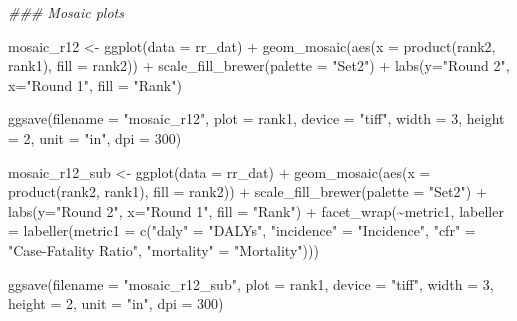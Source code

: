 \documentclass[
  letterpaper,
  DIV=11,
  numbers=noendperiod]{scrartcl}
\newenvironment{Shaded}{\begin{snugshade}}{\end{snugshade}}
\newcommand{\AttributeTok}[1]{\textcolor[rgb]{0.40,0.45,0.13}{#1}}
\newcommand{\DecValTok}[1]{\textcolor[rgb]{0.68,0.00,0.00}{#1}}
\newcommand{\DocumentationTok}[1]{\textcolor[rgb]{0.37,0.37,0.37}{\textit{#1}}}
\newcommand{\FunctionTok}[1]{\textcolor[rgb]{0.28,0.35,0.67}{#1}}
\newcommand{\NormalTok}[1]{\textcolor[rgb]{0.00,0.23,0.31}{#1}}
\newcommand{\OtherTok}[1]{\textcolor[rgb]{0.00,0.23,0.31}{#1}}
\newcommand{\SpecialCharTok}[1]{\textcolor[rgb]{0.37,0.37,0.37}{#1}}
\newcommand{\StringTok}[1]{\textcolor[rgb]{0.13,0.47,0.30}{#1}}
\begin{document}
\begin{Shaded}
\begin{Highlighting}[]
\DocumentationTok{\#\#\# Mosaic plots}

\NormalTok{mosaic\_r12 }\OtherTok{\textless{}{-}} \FunctionTok{ggplot}\NormalTok{(}\AttributeTok{data =}\NormalTok{ rr\_dat) }\SpecialCharTok{+}
    \FunctionTok{geom\_mosaic}\NormalTok{(}\FunctionTok{aes}\NormalTok{(}\AttributeTok{x =} \FunctionTok{product}\NormalTok{(rank2, rank1), }\AttributeTok{fill =}\NormalTok{ rank2)) }\SpecialCharTok{+}
    \FunctionTok{scale\_fill\_brewer}\NormalTok{(}\AttributeTok{palette =} \StringTok{"Set2"}\NormalTok{) }\SpecialCharTok{+}
    \FunctionTok{labs}\NormalTok{(}\AttributeTok{y=}\StringTok{"Round 2"}\NormalTok{, }\AttributeTok{x=}\StringTok{"Round 1"}\NormalTok{, }\AttributeTok{fill =} \StringTok{"Rank"}\NormalTok{)}

\FunctionTok{ggsave}\NormalTok{(}\AttributeTok{filename =} \StringTok{"mosaic\_r12"}\NormalTok{, }\AttributeTok{plot =}\NormalTok{ rank1, }\AttributeTok{device =} \StringTok{"tiff"}\NormalTok{, }\AttributeTok{width =} \DecValTok{3}\NormalTok{, }\AttributeTok{height =} \DecValTok{2}\NormalTok{, }\AttributeTok{unit =} \StringTok{"in"}\NormalTok{, }\AttributeTok{dpi =} \DecValTok{300}\NormalTok{)}

\NormalTok{mosaic\_r12\_sub }\OtherTok{\textless{}{-}} \FunctionTok{ggplot}\NormalTok{(}\AttributeTok{data =}\NormalTok{ rr\_dat) }\SpecialCharTok{+}
    \FunctionTok{geom\_mosaic}\NormalTok{(}\FunctionTok{aes}\NormalTok{(}\AttributeTok{x =} \FunctionTok{product}\NormalTok{(rank2, rank1), }\AttributeTok{fill =}\NormalTok{ rank2)) }\SpecialCharTok{+}
    \FunctionTok{scale\_fill\_brewer}\NormalTok{(}\AttributeTok{palette =} \StringTok{"Set2"}\NormalTok{) }\SpecialCharTok{+}
    \FunctionTok{labs}\NormalTok{(}\AttributeTok{y=}\StringTok{"Round 2"}\NormalTok{, }\AttributeTok{x=}\StringTok{"Round 1"}\NormalTok{, }\AttributeTok{fill =} \StringTok{"Rank"}\NormalTok{) }\SpecialCharTok{+}
    \FunctionTok{facet\_wrap}\NormalTok{(}\SpecialCharTok{\textasciitilde{}}\NormalTok{metric1, }
               \AttributeTok{labeller =} \FunctionTok{labeller}\NormalTok{(}\AttributeTok{metric1 =} \FunctionTok{c}\NormalTok{(}\StringTok{"daly"} \OtherTok{=} \StringTok{"DALYs"}\NormalTok{, }\StringTok{"incidence"} \OtherTok{=} \StringTok{"Incidence"}\NormalTok{, }\StringTok{"cfr"} \OtherTok{=} \StringTok{"Case{-}Fatality Ratio"}\NormalTok{, }\StringTok{"mortality"} \OtherTok{=} \StringTok{"Mortality"}\NormalTok{)))}

\FunctionTok{ggsave}\NormalTok{(}\AttributeTok{filename =} \StringTok{"mosaic\_r12\_sub"}\NormalTok{, }\AttributeTok{plot =}\NormalTok{ rank1, }\AttributeTok{device =} \StringTok{"tiff"}\NormalTok{, }\AttributeTok{width =} \DecValTok{3}\NormalTok{, }\AttributeTok{height =} \DecValTok{2}\NormalTok{, }\AttributeTok{unit =} \StringTok{"in"}\NormalTok{, }\AttributeTok{dpi =} \DecValTok{300}\NormalTok{)}
\end{Highlighting}
\end{Shaded}
\end{document}
